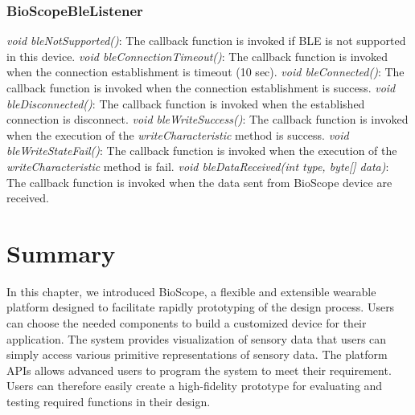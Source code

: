 \subsubsection{BioScopeBleListener}
\textit{void bleNotSupported()}: The callback function is invoked if BLE is not supported in this device.
\vspace{10pt}
\newline
\textit{void bleConnectionTimeout()}: The callback function is invoked when the connection establishment is timeout (10 sec).
\vspace{10pt}
\newline
\textit{void bleConnected()}: The callback function is invoked when the connection establishment is success.
\vspace{10pt}
\newline
\textit{void bleDisconnected()}: The callback function is invoked when the established connection is disconnect.
\vspace{10pt}
\newline
\textit{void bleWriteSuccess()}: The callback function is invoked when the execution of the \textit{writeCharacteristic} method is success.
\vspace{10pt}
\newline
\textit{void bleWriteStateFail()}: The callback function is invoked when the execution of the \textit{writeCharacteristic} method is fail.
\vspace{10pt}
\newline
\textit{void bleDataReceived(int type, byte[] data)}: The callback function is invoked when the data sent from BioScope device are received.
\vspace{10pt}
\newline

\section{Summary}
In this chapter, we introduced BioScope, a flexible and extensible wearable platform designed to facilitate rapidly prototyping of the design process.
Users can choose the needed components to build a customized device for their application.
The system provides visualization of sensory data that users can simply access various primitive representations of sensory data.
The platform APIs allows advanced users to program the system to meet their requirement.
Users can therefore easily create a high-fidelity prototype for evaluating and testing required functions in their design.

\let\cleardoublepage\clearpage